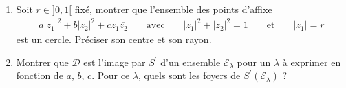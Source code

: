 \begin{enumerate}
 \item Soit $r\in]0,1[$ fixé, montrer que l'ensemble des points d'affixe
\begin{align*}
 a|z_1|^2 + b|z_2|^2 +cz_1\overline{z_2} & & \text{ avec } & & |z_1|^2+|z_2|^2 = 1 & &  \text{ et }  & & |z_1| =r 
\end{align*}
est un cercle.  Préciser son centre et son rayon.

\item Montrer que $\mathcal D$ est l'image par $S^\prime$ d'un ensemble $\mathcal E_\lambda$ pour un $\lambda$ à exprimer en fonction de $a$, $b$, $c$. Pour ce $\lambda$, quels sont les foyers de $S^\prime(\mathcal E_\lambda)$ ?
\end{enumerate}
